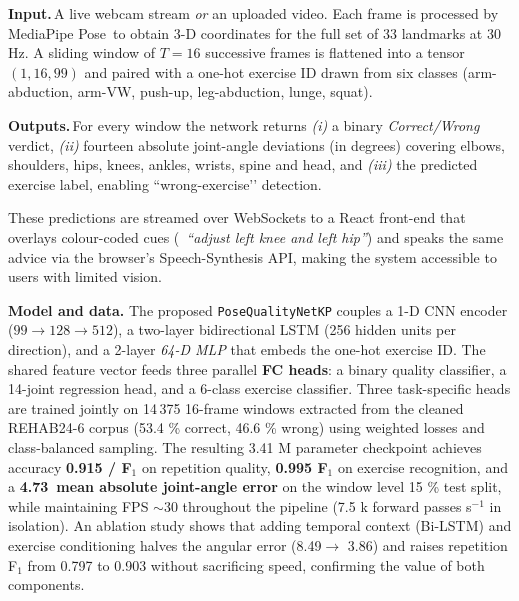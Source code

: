 \documentclass{article}
\begin{document}
\textbf{Input.} A live webcam stream \emph{or} an uploaded video.  
Each frame is processed by MediaPipe Pose\,\cite{lugaresi2019mediapipe} to obtain 3-D
coordinates for the full set of 33 landmarks at 30 Hz.  
A sliding window of \(T=16\) successive frames is flattened into a tensor
\((1,16,99)\) and paired with a one-hot exercise ID drawn from six
classes (arm-abduction, arm-VW, push-up, leg-abduction, lunge, squat).

\medskip
\textbf{Outputs.} For every window the network returns  
\emph{(i)} a binary \emph{Correct/Wrong} verdict,  
\emph{(ii)} fourteen absolute joint-angle deviations (in degrees) covering elbows,
shoulders, hips, knees, ankles, wrists, spine and head, and  
\emph{(iii)} the predicted exercise label, enabling “wrong-exercise’’ detection.

These predictions are streamed over WebSockets to a React front-end that overlays colour-coded cues (\eg~\emph{``adjust left knee and left hip''}) and speaks the same advice via the browser’s Speech-Synthesis API, making the system accessible to users with limited vision.

\textbf{Model and data.}  
The proposed \texttt{PoseQualityNetKP} couples a 1-D \mbox{CNN} encoder
($99\!\rightarrow\!128\!\rightarrow\!512$), a two-layer
bidirectional LSTM (256 hidden units per direction),
and a 2-layer \emph{64-D MLP} that embeds the one-hot exercise ID.
The shared feature vector feeds three parallel \textbf{FC heads}:
a binary quality classifier, a 14-joint regression head, and a
6-class exercise classifier. Three task-specific heads are trained jointly on 14\,375
16-frame windows extracted from the cleaned
\textsc{REHAB24-6} corpus (53.4 \% correct, 46.6 \% wrong) using
weighted losses and class-balanced sampling.
The resulting 3.41 M parameter checkpoint achieves accuracy \textbf{ 0.915 / F\(_1\)} on repetition quality,
\textbf{0.995 F\(_1\)} on exercise recognition,
and a \textbf{4.73\textdegree\ mean absolute joint-angle error}
on the window level 15 \% test split,
while maintaining FPS \(\sim\!30\) throughout the pipeline (7.5 k forward passes s\(^{-1}\) in isolation).
An ablation study shows that adding temporal context (Bi-LSTM) and
exercise conditioning halves the angular error
(8.49\textdegree\;\(\rightarrow\) 3.86\textdegree)
and raises repetition F\(_1\) from 0.797 to 0.903 without
sacrificing speed, confirming the value of both components.
\end{document}
